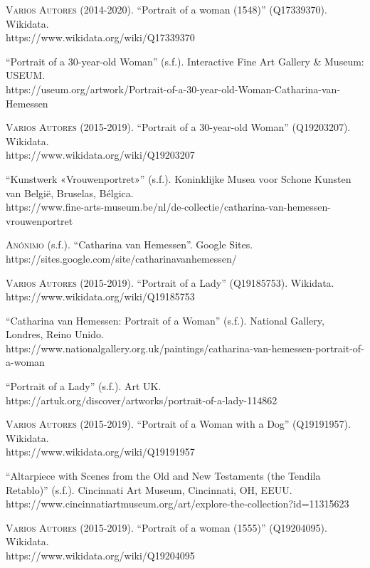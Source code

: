 \documentclass[12pt]{book}
\begin{document}
\textsc{Varios Autores} (2014-2020). ``Portrait of a woman (1548)'' (Q17339370). Wikidata.\\
https://www.wikidata.org/wiki/Q17339370\bigskip

``Portrait of a 30-year-old Woman'' (s.f.). Interactive Fine Art Gallery \& Museum: USEUM.\\
https://useum.org/artwork/Portrait-of-a-30-year-old-Woman-Catharina-van-Hemessen\bigskip

\textsc{Varios Autores} (2015-2019). ``Portrait of a 30-year-old Woman'' (Q19203207). Wikidata.\\
https://www.wikidata.org/wiki/Q19203207\bigskip

``Kunstwerk «Vrouwenportret»'' (s.f.). Koninklijke Musea voor Schone Kunsten van België, Bruselas, Bélgica.\\
https://www.fine-arts-museum.be/nl/de-collectie/catharina-van-hemessen-vrouwenportret\bigskip

\textsc{Anónimo} (s.f.). ``Catharina van Hemessen''. Google Sites.\\
https://sites.google.com/site/catharinavanhemessen/\bigskip

\textsc{Varios Autores} (2015-2019). ``Portrait of a Lady'' (Q19185753). Wikidata.\\
https://www.wikidata.org/wiki/Q19185753\bigskip

``Catharina van Hemessen: Portrait of a Woman'' (s.f.). National Gallery, Londres, Reino Unido.\\
https://www.nationalgallery.org.uk/paintings/catharina-van-hemessen-portrait-of-a-woman\bigskip

``Portrait of a Lady'' (s.f.). Art UK.\\
https://artuk.org/discover/artworks/portrait-of-a-lady-114862\bigskip

\textsc{Varios Autores} (2015-2019). ``Portrait of a Woman with a Dog'' (Q19191957). Wikidata.\\
https://www.wikidata.org/wiki/Q19191957\bigskip

``Altarpiece with Scenes from the Old and New Testaments (the Tendila Retablo)'' (s.f.). Cincinnati Art Museum, Cincinnati, OH, EEUU.\\
https://www.cincinnatiartmuseum.org/art/explore-the-collection?id=11315623\bigskip

\textsc{Varios Autores} (2015-2019). ``Portrait of a woman (1555)'' (Q19204095). Wikidata.\\
https://www.wikidata.org/wiki/Q19204095\bigskip
\end{document}
